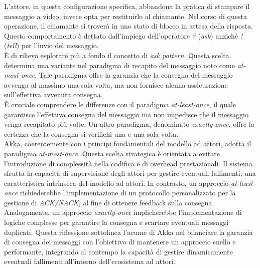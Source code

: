 L'attore, in questa configurazione specifica, abbandona la pratica di stampare il messaggio a video, invece opta per restituirlo al chiamante.
Nel corso di questa operazione, il chiamante si troverà in uno stato di blocco in attesa della risposta.
Questo comportamento è dettato dall'impiego dell'operatore \textit{?} (\textit{ask}) anziché \textit{!} (\textit{tell}) per l'invio del messaggio. \\
È di rilievo esplorare più a fondo il concetto di \textit{ask pattern}.
Questa scelta determina una variante nel paradigma di recapito del messaggio noto come \textit{at-most-once}.
Tale paradigma offre la garanzia che la consegna del messaggio avvenga al massimo una sola volta, ma non fornisce alcuna assicurazione sull'effettiva avvenuta consegna. \\
È cruciale comprendere le differenze con il paradigma \textit{at-least-once}, il quale garantisce l'effettiva consegna del messaggio ma non impedisce che il messaggio venga recapitato più volte.
Un altro paradigma, denominato \textit{exactly-once}, offre la certezza che la consegna si verifichi una e una sola volta. \\
Akka, coerentemente con i principi fondamentali del modello ad attori, adotta il paradigma \textit{at-most-once}.
Questa scelta strategica è orientata a evitare l'introduzione di complessità nella codifica e di overhead prestazionali.
Il sistema sfrutta la capacità di supervisione degli attori per gestire eventuali fallimenti, una caratteristica intrinseca del modello ad attori.
In contrasto, un approccio \textit{at-least-once} richiederebbe l'implementazione di un protocollo personalizzato per la gestione di \textit{ACK/NACK}, al fine di ottenere feedback sulla consegna.
Analogamente, un approccio \textit{exactly-once} implicherebbe l'implementazione di logiche complesse per garantire la consegna e scartare eventuali messaggi duplicati.
Questa riflessione sottolinea l'acume di Akka nel bilanciare la garanzia di consegna dei messaggi con l'obiettivo di mantenere un approccio snello e performante, integrando al contempo la capacità di gestire dinamicamente eventuali fallimenti all'interno dell'ecosistema ad attori.

